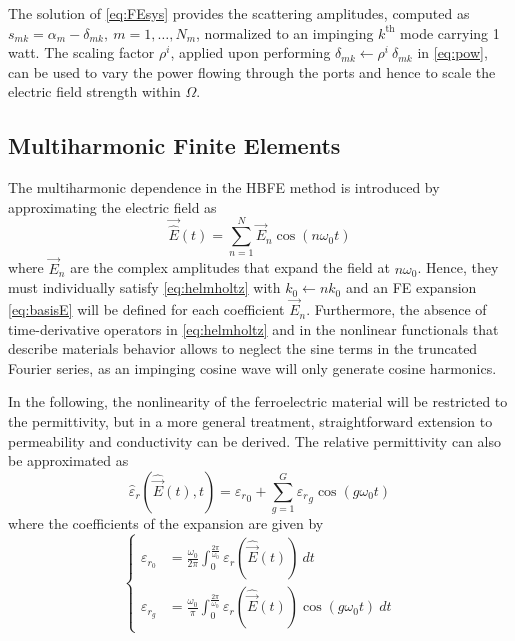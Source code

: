 \documentclass[AMA,STIX2COL]{WileyNJD-v2}
\begin{document}
The solution of \eqref{eq:FEsys} provides the scattering amplitudes, computed as $s_{mk} = \alpha_{m} - \delta_{mk}, \ m=1,\ldots,N_m$, normalized to an impinging $k^\text{th}$ mode carrying 1 watt. The scaling factor $\rho^i$, applied upon performing $\delta_{mk} \leftarrow \rho^i \ \delta_{mk}$ in \eqref{eq:pow}, can be used to vary the power flowing through the ports and  hence to scale the electric field strength within $\Omega$.

\subsection{Multiharmonic Finite Elements}\label{sec:HBFE}


The multiharmonic dependence in the HBFE method is introduced by approximating the electric field as \cite{Bachinger2005}
%
\begin{equation} 
\label{eq:field}
\vec{\hat{E}}(t) = \sum_{n=1}^N \vec{E}_{n} \cos (n \omega_0 t)
\end{equation}
%
\noindent where $\vec{E}_{n}$ are the complex amplitudes that expand the field at $n\omega_0$. Hence, they must individually satisfy \eqref{eq:helmholtz} with $k_0 \leftarrow n k_0$ and an FE expansion \eqref{eq:basisE} will be defined for each coefficient $\vec{E}_{n}$. Furthermore, the absence of time-derivative operators in \eqref{eq:helmholtz} and in the nonlinear functionals that describe materials behavior  allows to neglect the sine terms in the truncated Fourier series, as an impinging cosine wave will only generate cosine harmonics.

In the following, the nonlinearity of the ferroelectric material will be restricted to the permittivity, but in a more general treatment, straightforward extension to permeability \cite{ntibarikure2014harmonic} and conductivity can be derived. The relative permittivity can also be approximated as
%
\begin{equation} 
\label{eq:eps}
\hat{{\varepsilon}}_r(\hat{\vec{E}}(t), t) =  {\varepsilon_r}_0+  \sum_{g=1}^G {\varepsilon_r}_g \cos ( g \omega_0 t)
\end{equation} 
\noindent where the coefficients of the expansion are given by
\begin{equation} 
\label{eq:epsCoeffs}
\left \lbrace
\begin{aligned}
{\varepsilon}_{r_{0}} &=  \frac{\omega_0}{2 \pi}\int_0^{\frac{2\pi}{\omega_0}} {\varepsilon}_r(\hat{\vec{E}}(t)) \ dt \\
{\varepsilon}_{r_{g}} &=  \frac{\omega_0}{\pi}\int_0^{\frac{2\pi}{\omega_0}} {\varepsilon}_r(\hat{\vec{E}}(t)) \cos ( g \omega_0 t) \ dt
\end{aligned}
\right.
\end{equation}
%
\end{document}
